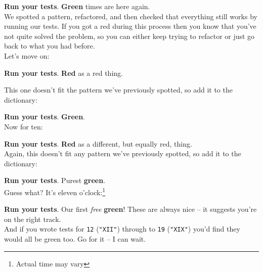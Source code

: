 

\textbf{Run your tests}. \textbf{Green} times are here again.
\\

We spotted a pattern, refactored, and then checked that everything still works by running our tests. If you got a red during this process then you know that you've not quite solved the problem, so you can either keep trying to refactor or just go back to what you had before.
\\

Let's move on:



\textbf{Run your tests}. \textbf{Red} as a red thing.

\pagebreak

This one doesn't fit the pattern we've previously spotted, so add it to the dictionary:



\textbf{Run your tests}. \textbf{Green}.
\\

Now for ten:



\textbf{Run your tests}. \textbf{Red} as\textellipsis{} a different, but equally red, thing.
\\

Again, this doesn't fit any pattern we've previously spotted, so add it to the dictionary:


\textbf{Run your tests}. Purest \textbf{green}.
\\

Guess what? It's eleven o'clock:\footnote{Actual time may vary}


\textbf{Run your tests}. Our first \textit{free} \textbf{green}! These are always nice – it suggests you're on the right track.
\\

And if you wrote tests for \texttt{12} (\texttt{"XII"}) through to \texttt{19} (\texttt{"XIX"}) you'd find they would all be green too. Go for it – I can wait.
\\

